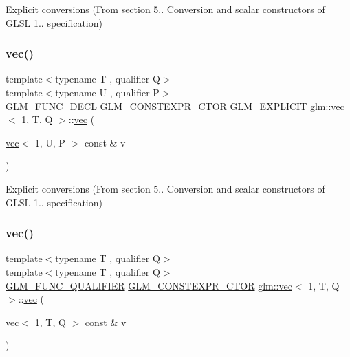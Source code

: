 Explicit conversions (From section 5.. Conversion and scalar constructors of G\+L\+SL 1.. specification) 

\mbox{\label{structglm_1_1vec_3_011_00_01_t_00_01_q_01_4_abd93e6bf42d506d85f4aea0c5d92ecc2}} 
\subsubsection{\texorpdfstring{vec()}{vec()}\hspace{0.1cm}{\footnotesize\ttfamily [8/14]}}
{\footnotesize\ttfamily template$<$typename T , qualifier Q$>$ \\
template$<$typename U , qualifier P$>$ \\
\hyperlink{setup_8hpp_ab2d052de21a70539923e9bcbf6e83a51}{G\+L\+M\+\_\+\+F\+U\+N\+C\+\_\+\+D\+E\+CL} \hyperlink{setup_8hpp_ad34178a09666081abdb573c14d1f4a5a}{G\+L\+M\+\_\+\+C\+O\+N\+S\+T\+E\+X\+P\+R\+\_\+\+C\+T\+OR} \hyperlink{setup_8hpp_a6c74f5a5e7b134ab69023ff9a30d4d5d}{G\+L\+M\+\_\+\+E\+X\+P\+L\+I\+C\+IT} \hyperlink{structglm_1_1vec}{glm\+::vec}$<$ 1, T, Q $>$\+::\hyperlink{structglm_1_1vec}{vec} (\begin{DoxyParamCaption}\item[{\hyperlink{structglm_1_1vec}{vec}$<$ 1, U, P $>$ const \&}]{v }\end{DoxyParamCaption})}



Explicit conversions (From section 5.. Conversion and scalar constructors of G\+L\+SL 1.. specification) 

\mbox{\label{structglm_1_1vec_3_011_00_01_t_00_01_q_01_4_acf2830b0c38c9707dcda85083f1c93ba}} 
\subsubsection{\texorpdfstring{vec()}{vec()}\hspace{0.1cm}{\footnotesize\ttfamily [9/14]}}
{\footnotesize\ttfamily template$<$typename T , qualifier Q$>$ \\
template$<$typename T , qualifier Q$>$ \\
\hyperlink{setup_8hpp_a33fdea6f91c5f834105f7415e2a64407}{G\+L\+M\+\_\+\+F\+U\+N\+C\+\_\+\+Q\+U\+A\+L\+I\+F\+I\+ER} \hyperlink{setup_8hpp_ad34178a09666081abdb573c14d1f4a5a}{G\+L\+M\+\_\+\+C\+O\+N\+S\+T\+E\+X\+P\+R\+\_\+\+C\+T\+OR} \hyperlink{structglm_1_1vec}{glm\+::vec}$<$ 1, T, Q $>$\+::\hyperlink{structglm_1_1vec}{vec} (\begin{DoxyParamCaption}\item[{\hyperlink{structglm_1_1vec}{vec}$<$ 1, T, Q $>$ const \&}]{v }\end{DoxyParamCaption})}



